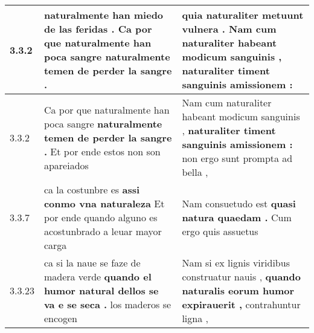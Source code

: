 \begin{tabular}{|p{1cm}|p{6.5cm}|p{6.5cm}|}
3.3.2 & naturalmente han miedo de las feridas . \textbf{ Ca por que naturalmente han poca sangre } naturalmente temen de perder la sangre . & quia naturaliter metuunt vulnera . \textbf{ Nam cum naturaliter habeant modicum sanguinis , } naturaliter timent sanguinis amissionem : \\\hline
3.3.2 & Ca por que naturalmente han poca sangre \textbf{ naturalmente temen de perder la sangre . } Et por ende estos non son apareiados & Nam cum naturaliter habeant modicum sanguinis , \textbf{ naturaliter timent sanguinis amissionem : } non ergo sunt prompta ad bella , \\\hline
3.3.7 & ca la costunbre es \textbf{ assi conmo vna naturaleza } Et por ende quando alguno es acostunbrado a leuar mayor carga & Nam consuetudo est \textbf{ quasi natura quaedam . } Cum ergo quis assuetus \\\hline
3.3.23 & ca si la naue se faze de madera verde \textbf{ quando el humor natural dellos se va e se seca . } los maderos se encogen & Nam si ex lignis viridibus construatur nauis , \textbf{ quando naturalis eorum humor expirauerit , } contrahuntur ligna , \\\hline

\end{tabular}
